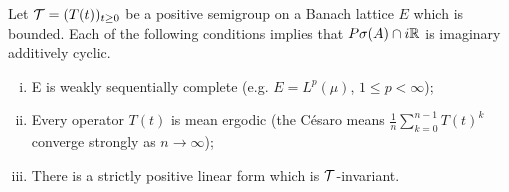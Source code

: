 \begin{corollary}\label{cor:c3-4.3}
	Let $\mathcal{T} = (T(t))_{t \geq 0}$ be a positive semigroup on a Banach lattice $E$ which is bounded. 
	Each of the following conditions implies that $P\sigma(A)\cap i\mathbb{R} $ is imaginary additively cyclic.
	\begin{enumerate}[(i)]
		\item E is weakly sequentially complete (e.g. $E = L^{p}(\mu)$, $1 \leq p < \infty$);
		\item Every operator $T(t)$ is mean ergodic (\ie the Césaro means $\frac{1}{n}\sum_{k=0}^{n-1}T(t)^{k}$ converge strongly as $n \to  \infty$);
		\item There is a strictly positive linear form which is $\mathcal{T}$-invariant.
	\end{enumerate}
\end{corollary}
%
